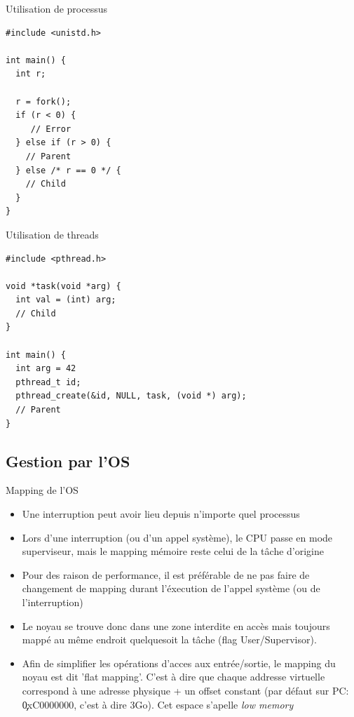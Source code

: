 \begin{frame}[fragile]{Utilisation de processus}
\begin{lstlisting}
#include <unistd.h>

int main() {
  int r;

  r = fork();
  if (r < 0) {
     // Error
  } else if (r > 0) {
    // Parent
  } else /* r == 0 */ {
    // Child
  }
}
\end{lstlisting}
\end{frame}

\begin{frame}[fragile]{Utilisation de threads}
\begin{lstlisting}
#include <pthread.h>

void *task(void *arg) {
  int val = (int) arg;
  // Child
}

int main() {
  int arg = 42
  pthread_t id;
  pthread_create(&id, NULL, task, (void *) arg);
  // Parent
}
\end{lstlisting}
\end{frame}

\subsection{Gestion par l'OS}

\begin{frame}[fragile]{Mapping de l'OS}
  \begin{itemize}
  \item  Une  interruption  peut  avoir  lieu  depuis  n'importe  quel
    processus
  \item Lors d'une interruption (ou  d'un appel système), le CPU passe
    en mode  superviseur, mais  le mapping mémoire  reste celui  de la
    tâche d'origine
  \item Pour  des raison de performance,  il est préférable  de ne pas
    faire  de  changement de  mapping  durant  l'éxecution de  l'appel
    système (ou de l'interruption)
  \item Le noyau se trouve donc  dans une zone interdite en accès mais
    toujours mappé au même endroit quelquesoit la tâche (flag User/Supervisor).
  \item Afin  de simplifier les opérations  d'acces aux entrée/sortie,
    le  mapping du  noyau est  dit 'flat  mapping'. C'est  à  dire que
    chaque addresse  virtuelle correspond à une adresse  physique + un
    offset constant  (par défaut sur PC: \c{0xC0000000},  c'est à dire
    3Go). Cet espace s'apelle \emph{low memory}
  \end{itemize}
\end{frame}

